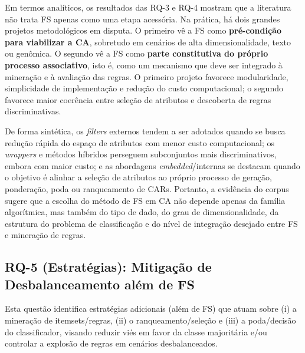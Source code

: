 Em termos analíticos, os resultados das RQ-3 e RQ-4 mostram que a literatura não trata FS apenas como uma etapa acessória. Na prática, há dois grandes projetos metodológicos em disputa. O primeiro vê a FS como \textbf{pré-condição para viabilizar a CA}, sobretudo em cenários de alta dimensionalidade, texto ou genômica. O segundo vê a FS como \textbf{parte constitutiva do próprio processo associativo}, isto é, como um mecanismo que deve ser integrado à mineração e à avaliação das regras. O primeiro projeto favorece modularidade, simplicidade de implementação e redução do custo computacional; o segundo favorece maior coerência entre seleção de atributos e descoberta de regras discriminativas.

De forma sintética, os \textit{filters} externos tendem a ser adotados quando se busca redução rápida do espaço de atributos com menor custo computacional; os \textit{wrappers} e métodos híbridos perseguem subconjuntos mais discriminativos, embora com maior custo; e as abordagens \textit{embedded}/internas se destacam quando o objetivo é alinhar a seleção de atributos ao próprio processo de geração, ponderação, poda ou ranqueamento de CARs. Portanto, a evidência do corpus sugere que a escolha do método de FS em CA não depende apenas da família algorítmica, mas também do tipo de dado, do grau de dimensionalidade, da estrutura do problema de classificação e do nível de integração desejado entre FS e mineração de regras.

\subsection{RQ-5 (Estratégias): Mitigação de Desbalanceamento além de FS}

Esta questão identifica estratégias adicionais (além de FS) que atuam sobre (i) a mineração de itemsets/regras, (ii) o ranqueamento/seleção e (iii) a poda/decisão do classificador, visando reduzir viés em favor da classe majoritária e/ou controlar a explosão de regras em cenários desbalanceados.

